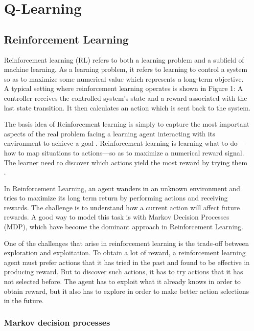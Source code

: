 \chapter{Q-Learning}




\section{Reinforcement Learning}

Reinforcement learning (RL) refers to both a learning problem and a subfield of machine
learning. As a learning problem, it refers to learning to control a system so as to maximize
some numerical value which represents a long-term objective. A typical setting where
reinforcement learning operates is shown in Figure 1: A controller receives the controlled
system’s state and a reward associated with the last state transition. It then calculates an
action which is sent back to the system.


The basis idea of Reinforcement learning  is simply to capture the most important aspects of the real problem facing a learning agent interacting with its environment to achieve a goal \cite{Sutton2012}. Reinforcement learning is learning what to do—how to map situations to actions—so as to maximize a numerical reward signal. The learner need to discover which actions yield the most reward by trying them \cite{Sutton2012}.

In Reinforcement Learning, an agent wanders in an unknown environment and tries to maximize its long term return by performing actions and receiving rewards. The challenge is to understand how a current action will affect future rewards. A good way to model this task is with Markov Decision Processes (MDP), which have become the dominant approach in Reinforcement Learning.

One of the challenges that arise in reinforcement learning is the trade-off between exploration and exploitation. To obtain a lot of reward, a reinforcement learning
agent must prefer actions that it has tried in the past and found to be effective in producing reward.
But to discover such actions, it has to try actions that it has not selected before. The agent has to exploit what it already knows in order to obtain reward, but it also has to explore in order to make better action selections in the future.


\subsection{Markov decision processes}

